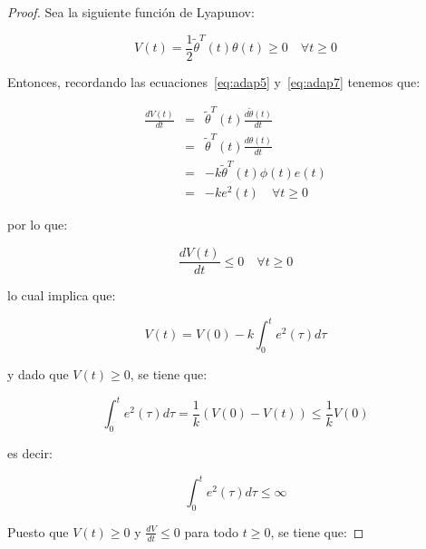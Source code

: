             \begin{proof}
                Sea la siguiente función de Lyapunov:

                \begin{equation*}
                    V(t) = \frac{1}{2} \tilde{\theta}^T(t) \theta(t) \ge 0 \quad \forall t \ge 0
                \end{equation*}

                Entonces, recordando las ecuaciones~\ref{eq:adap5} y~\ref{eq:adap7} tenemos que:

                \begin{eqnarray*}
                    \frac{d V(t)}{dt} & = & \tilde{\theta}^T(t) \frac{d \tilde{\theta}(t)}{dt} \\
                    & = & \tilde{\theta}^T(t) \frac{d \theta(t)}{dt} \\
                    & = & -k \tilde{\theta}^T(t) \phi(t) e(t) \\
                    & = & -k e^2(t) \quad \forall t \ge 0
                \end{eqnarray*}

                por lo que:

                \begin{equation*}
                    \frac{d V(t)}{dt} \le 0 \quad \forall t \ge 0
                \end{equation*}

                lo cual implica que:

                \begin{equation*}
                    V(t) = V(0) - k \int_0^t e^2(\tau) d\tau
                \end{equation*}

                y dado que $V(t) \ge 0$, se tiene que:

                \begin{equation*}
                    \int_0^t e^2(\tau) d\tau = \frac{1}{k} \left( V(0) - V(t) \right) \le \frac{1}{k} V(0)
                \end{equation*}

                es decir:

                \begin{equation*}
                    \int_0^t e^2(\tau) d\tau \le \infty
                \end{equation*}

                Puesto que $V(t) \ge 0$ y $\frac{dV}{dt} \le 0$ para todo $t \ge 0$, se tiene que:


\end{proof}
